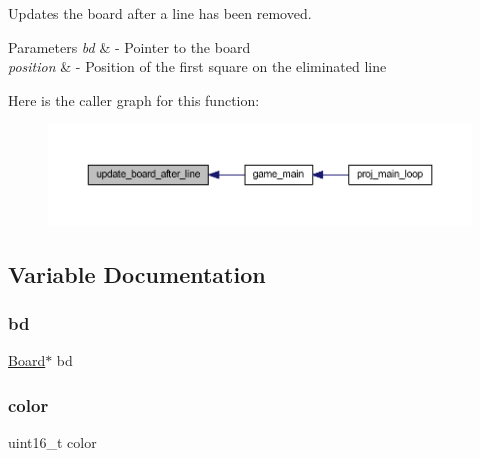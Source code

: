 Updates the board after a line has been removed. 


\begin{DoxyParams}{Parameters}
{\em bd} & -\/ Pointer to the board \\
\hline
{\em position} & -\/ Position of the first square on the eliminated line \\
\hline
\end{DoxyParams}
Here is the caller graph for this function\+:
\nopagebreak
\begin{figure}[H]
\begin{center}
\leavevmode
\includegraphics[width=350pt]{group__tetramino_ga2f2a68722efc3ecbd82eea0a337f6b7f_icgraph}
\end{center}
\end{figure}


\subsection{Variable Documentation}
\mbox{\label{group__tetramino_ga30c121d94ba906148e5a4b0546e723a3}} 
\subsubsection{\texorpdfstring{bd}{bd}}
{\footnotesize\ttfamily \mbox{\hyperlink{struct_board}{Board}}$\ast$ bd}

\mbox{\label{group__tetramino_ga0b10c5b0fa8e65e009263b93ba2671ae}} 
\subsubsection{\texorpdfstring{color}{color}\hspace{0.1cm}{\footnotesize\ttfamily [1/2]}}
{\footnotesize\ttfamily uint16\+\_\+t color}

\mbox{\label{group__tetramino_ga0b10c5b0fa8e65e009263b93ba2671ae}} 
